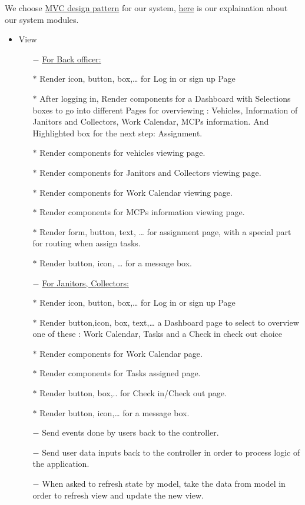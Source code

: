 \documentclass[a4paper]{article}
\begin{document}
We choose \hyperlink{MVC}{MVC design pattern} for our system, \hyperlink{module}{here} is our explaination about our system modules.
\begin{itemize}
    \item View
    \begin{itemize}
\item[$-$] \underline{For Back officer:}
\item[$*$] Render icon, button, box,… for Log in or sign up Page 
\item[$*$] After logging in, Render components for a Dashboard with Selections boxes to go into different Pages for overviewing : Vehicles, Information of Janitors and Collectors, Work Calendar, MCPs information. And Highlighted box for the next step: Assignment.
\item[$*$] Render components for vehicles viewing page.
\item[$*$] Render components for Janitors and Collectors viewing page.
\item[$*$] Render components for Work Calendar viewing page.
\item[$*$] Render components for MCPs information viewing page.
\item[$*$] Render form, button, text, … for assignment page, with a special part for routing when assign tasks.
\item[$*$] Render button, icon, … for a message box. 
\item[$-$] \underline{For Janitors, Collectors:}
\item[$*$] Render icon, button, box,… for Log in or sign up Page 
\item[$*$] Render button,icon, box, text,… a Dashboard page to select to overview one of these : Work Calendar, Tasks and a Check in check out choice
\item[$*$] Render components for Work Calendar page.
\item[$*$] Render components for Tasks assigned page.
\item[$*$] Render button, box,.. for Check in/Check out page.
\item[$*$] Render button, icon,… for a message box.
\item[$-$] Send events done by users back to the controller.
\item[$-$] Send user data inputs back to the controller in order to process logic of the application. 
\item[$-$] When asked to refresh state by model, take the data from model in order to refresh view and update the new view.


\end{itemize}
\end{itemize}
\end{document}
